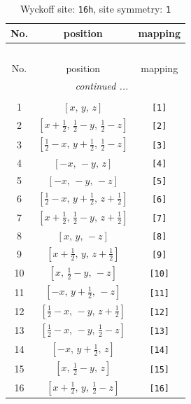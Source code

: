 \documentclass[fleqn,8pt]{jsarticle}
\begin{document}
\begin{longtable}{ccc}
\caption{Wyckoff site: {\tt 16h}, site symmetry: {\tt 1}}
 \\
 \hline \hline
No. & position & mapping \\ \hline \endfirsthead

\multicolumn{2}{l}{\tablename\ \thetable{}} \\
 \hline \hline
No. & position & mapping \\ \hline \endhead

 \hline \hline
\multicolumn{2}{r}{\footnotesize\it continued ...} \\ \endfoot

 \hline \hline
\multicolumn{2}{r}{} \\ \endlastfoot

1 & $\left[ x,\, y,\, z \right]$ & {\tt [1]} \\ \hline
2 & $\left[ x + \frac{1}{2},\, \frac{1}{2} - y,\, \frac{1}{2} - z \right]$ & {\tt [2]} \\ \hline
3 & $\left[ \frac{1}{2} - x,\, y + \frac{1}{2},\, \frac{1}{2} - z \right]$ & {\tt [3]} \\ \hline
4 & $\left[ - x,\, - y,\, z \right]$ & {\tt [4]} \\ \hline
5 & $\left[ - x,\, - y,\, - z \right]$ & {\tt [5]} \\ \hline
6 & $\left[ \frac{1}{2} - x,\, y + \frac{1}{2},\, z + \frac{1}{2} \right]$ & {\tt [6]} \\ \hline
7 & $\left[ x + \frac{1}{2},\, \frac{1}{2} - y,\, z + \frac{1}{2} \right]$ & {\tt [7]} \\ \hline
8 & $\left[ x,\, y,\, - z \right]$ & {\tt [8]} \\ \hline
9 & $\left[ x + \frac{1}{2},\, y,\, z + \frac{1}{2} \right]$ & {\tt [9]} \\ \hline
10 & $\left[ x,\, \frac{1}{2} - y,\, - z \right]$ & {\tt [10]} \\ \hline
11 & $\left[ - x,\, y + \frac{1}{2},\, - z \right]$ & {\tt [11]} \\ \hline
12 & $\left[ \frac{1}{2} - x,\, - y,\, z + \frac{1}{2} \right]$ & {\tt [12]} \\ \hline
13 & $\left[ \frac{1}{2} - x,\, - y,\, \frac{1}{2} - z \right]$ & {\tt [13]} \\ \hline
14 & $\left[ - x,\, y + \frac{1}{2},\, z \right]$ & {\tt [14]} \\ \hline
15 & $\left[ x,\, \frac{1}{2} - y,\, z \right]$ & {\tt [15]} \\ \hline
16 & $\left[ x + \frac{1}{2},\, y,\, \frac{1}{2} - z \right]$ & {\tt [16]} \\
\end{longtable}
\end{document}
